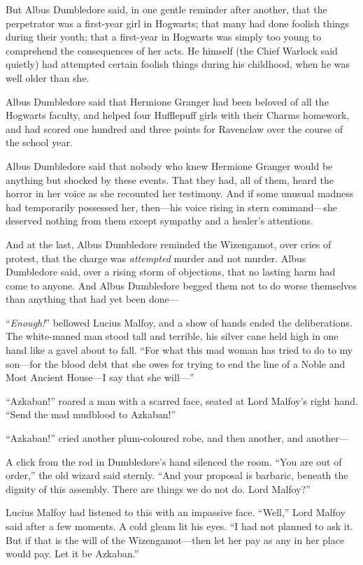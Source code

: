 But Albus Dumbledore said, in one gentle reminder after another, that the perpetrator was a first-year girl in Hogwarts; that many had done foolish things during their youth; that a first-year in Hogwarts was simply too young to comprehend the consequences of her acts. He himself (the Chief Warlock said quietly) had attempted certain foolish things during his childhood, when he was well older than she.

Albus Dumbledore said that Hermione Granger had been beloved of all the Hogwarts faculty, and helped four Hufflepuff girls with their Charms homework, and had scored one hundred and three points for Ravenclaw over the course of the school year.

Albus Dumbledore said that nobody who knew Hermione Granger would be anything but shocked by these events. That they had, all of them, heard the horror in her voice as she recounted her testimony. And if some unusual madness had temporarily possessed her, then—his voice rising in stern command—she deserved nothing from them except sympathy and a healer’s attentions.

And at the last, Albus Dumbledore reminded the Wizengamot, over cries of protest, that the charge was \emph{attempted} murder and not murder. Albus Dumbledore said, over a rising storm of objections, that no lasting harm had come to anyone. And Albus Dumbledore begged them not to do worse themselves than anything that had yet been done—

“\emph{Enough!}” bellowed Lucius Malfoy, and a show of hands ended the deliberations. The white-maned man stood tall and terrible, his silver cane held high in one hand like a gavel about to fall. “For what this mad woman has tried to do to my son—for the blood debt that she owes for trying to end the line of a Noble and Most Ancient House—I say that she will—”

“Azkaban!” roared a man with a scarred face, seated at Lord Malfoy’s right hand. “Send the mad mudblood to Azkaban!”

“Azkaban!” cried another plum-coloured robe, and then another, and another—

A click from the rod in Dumbledore’s hand silenced the room. “You are out of order,” the old wizard said sternly. “And your proposal is barbaric, beneath the dignity of this assembly. There are things we do not do. Lord Malfoy?”

Lucius Malfoy had listened to this with an impassive face. “Well,” Lord Malfoy said after a few moments. A cold gleam lit his eyes. “I had not planned to ask it. But if that is the will of the Wizengamot—then let her pay as any in her place would pay. Let it be Azkaban.”

